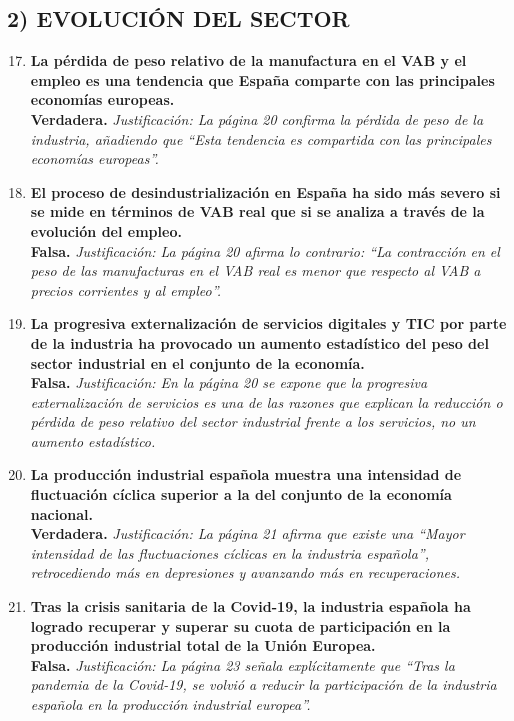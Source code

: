 \subsection*{2) EVOLUCIÓN DEL SECTOR}

\begin{enumerate}[label=\textbf{\arabic*.}]
    \setcounter{enumi}{16}

    \item \textbf{La pérdida de peso relativo de la manufactura en el VAB y el empleo es una tendencia que España comparte con las principales economías europeas.} \\
    \textbf{Verdadera.} \textit{Justificación: La página 20 confirma la pérdida de peso de la industria, añadiendo que ``Esta tendencia es compartida con las principales economías europeas''.}

    \item \textbf{El proceso de desindustrialización en España ha sido más severo si se mide en términos de VAB real que si se analiza a través de la evolución del empleo.} \\
    \textbf{Falsa.} \textit{Justificación: La página 20 afirma lo contrario: ``La contracción en el peso de las manufacturas en el VAB real es menor que respecto al VAB a precios corrientes y al empleo''.}

    \item \textbf{La progresiva externalización de servicios digitales y TIC por parte de la industria ha provocado un aumento estadístico del peso del sector industrial en el conjunto de la economía.} \\
    \textbf{Falsa.} \textit{Justificación: En la página 20 se expone que la progresiva externalización de servicios es una de las razones que explican la reducción o pérdida de peso relativo del sector industrial frente a los servicios, no un aumento estadístico.}

    \item \textbf{La producción industrial española muestra una intensidad de fluctuación cíclica superior a la del conjunto de la economía nacional.} \\
    \textbf{Verdadera.} \textit{Justificación: La página 21 afirma que existe una ``Mayor intensidad de las fluctuaciones cíclicas en la industria española'', retrocediendo más en depresiones y avanzando más en recuperaciones.}

    \item \textbf{Tras la crisis sanitaria de la Covid-19, la industria española ha logrado recuperar y superar su cuota de participación en la producción industrial total de la Unión Europea.} \\
    \textbf{Falsa.} \textit{Justificación: La página 23 señala explícitamente que ``Tras la pandemia de la Covid-19, se volvió a reducir la participación de la industria española en la producción industrial europea''.}


\end{enumerate}
